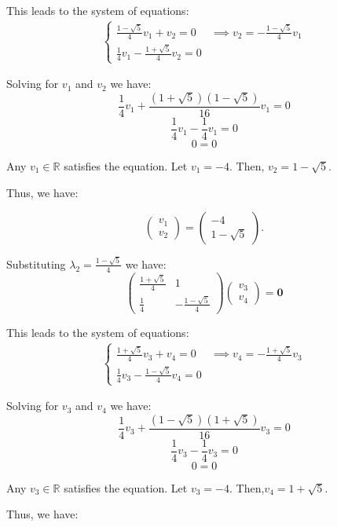 \documentclass [a4paper]{article}
\begin{document}
This leads to the system of equations:
\begin{align*}
\begin{cases}
\frac{1 - \sqrt{5}}{4} v_1 + v_2 = 0 & \implies v_2 = -\frac{1 - \sqrt{5}}{4} v_1 \\[1em]
\frac{1}{4} v_1 - \frac{1 + \sqrt{5}}{4} v_2 = 0 &
\end{cases}
\end{align*}

Solving for \(v_1\) and \(v_2\) we have: 
\[
\frac{1}{4} v_1 + \frac{(1 + \sqrt{5})(1 - \sqrt{5})}{16}v_1  = 0
\]
\[
\frac{1}{4} v_1 - \frac{1}{4} v_1 = 0
\]
\[0=0\]

Any \(v_1 \in \mathbb{R}\) satisfies the equation.  Let \(v_1 = -4\).
Then, \(
v_2 = 1 - \sqrt{5}. 
\)

Thus, we have: 

\[
\begin{pmatrix} v_1 \\ v_2 \end{pmatrix} = \begin{pmatrix} -4 \\ 1 - \sqrt{5}\end{pmatrix}.
\]

Substituting \(\lambda_2 = \frac{1 - \sqrt{5}}{4}\) we have:
\[
\begin{pmatrix} \frac{1 + \sqrt{5}}{4} & 1 \\ \frac{1}{4} & -\frac{1 - \sqrt{5}}{4} \end{pmatrix} \begin{pmatrix} v_3 \\ v_4 \end{pmatrix} = \textbf{0}
\]

This leads to the system of equations:
\begin{align*}
\begin{cases}
\frac{1 + \sqrt{5}}{4} v_3 + v_4 = 0 & \implies v_4 = -\frac{1 + \sqrt{5}}{4} v_3 \\[1em]
\frac{1}{4} v_3 - \frac{1 - \sqrt{5}}{4} v_4 = 0 &
\end{cases}
\end{align*}

Solving for \(v_3\) and \(v_4\) we have: 
\[
\frac{1}{4} v_3 + \frac{(1 - \sqrt{5})(1 + \sqrt{5})}{16}v_3  = 0
\]
\[
\frac{1}{4} v_3 - \frac{1}{4} v_3 = 0
\]
\[0=0\]

Any \(v_3 \in \mathbb{R}\) satisfies the equation. Let \(v_3 = -4\).
Then,\(
v_4 = 1 + \sqrt{5} 
\).

Thus, we have: 
\end{document}
